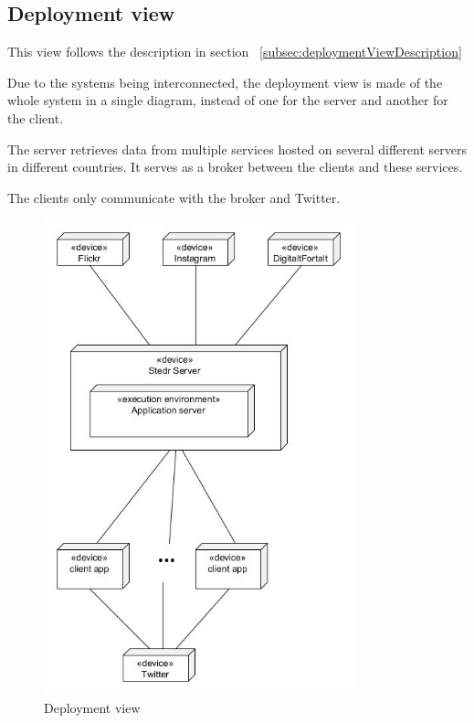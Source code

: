 \documentclass[11pt]{book}
\begin{document}
\subsection{Deployment view}
This view follows the description in section ~\ref{subsec:deploymentViewDescription}

Due to the systems being interconnected, the deployment view is made of the whole system in a single diagram, instead of one for the server and another for the client.

The server retrieves data from multiple services hosted on several different servers in different countries. It serves as a broker between the clients and these services.

The clients only communicate with the broker and Twitter.

\begin{figure}[H]
      \centering
      \includegraphics[width=0.8\textwidth]{Figures/Architecture/deploymentView.jpg}
      \caption{Deployment view}
      \label{fig:arch_deployment}
\end{figure}
\end{document}
